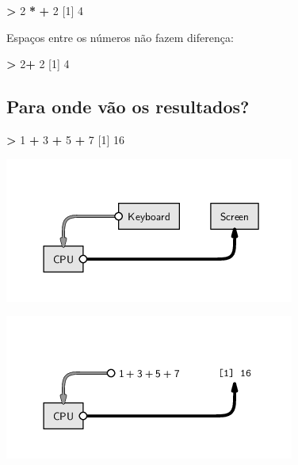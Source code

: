\documentclass[10pt,a4paper]{book}
\newenvironment{Shaded}{\begin{snugshade}}{\end{snugshade}}
\newcommand{\DecValTok}[1]{\textcolor[rgb]{0.00,0.00,0.81}{#1}}
\newcommand{\StringTok}[1]{\textcolor[rgb]{0.31,0.60,0.02}{#1}}
\newcommand{\OperatorTok}[1]{\textcolor[rgb]{0.81,0.36,0.00}{\textbf{#1}}}
\newcommand{\NormalTok}[1]{#1}
\begin{document}
\begin{Shaded}
\begin{Highlighting}[]
\OperatorTok{>}\StringTok{ }\DecValTok{2} \OperatorTok{*}
\OperatorTok{+}\StringTok{ }\DecValTok{2}
\NormalTok{[}\DecValTok{1}\NormalTok{] }\DecValTok{4}
\end{Highlighting}
\end{Shaded}

Espaços entre os números não fazem diferença:

\begin{Shaded}
\begin{Highlighting}[]
\OperatorTok{>}\StringTok{ }\DecValTok{2}\OperatorTok{+}\StringTok{         }\DecValTok{2}
\NormalTok{[}\DecValTok{1}\NormalTok{] }\DecValTok{4}
\end{Highlighting}
\end{Shaded}

\subsection{Para onde vão os
resultados?}\label{para-onde-vuxe3o-os-resultados}

\begin{Shaded}
\begin{Highlighting}[]
\OperatorTok{>}\StringTok{ }\DecValTok{1} \OperatorTok{+}\StringTok{ }\DecValTok{3} \OperatorTok{+}\StringTok{ }\DecValTok{5} \OperatorTok{+}\StringTok{ }\DecValTok{7}
\NormalTok{[}\DecValTok{1}\NormalTok{] }\DecValTok{16}
\end{Highlighting}
\end{Shaded}

\begin{center}\includegraphics[width=0.5\linewidth]{img/script-commandline} \end{center}

\begin{center}\includegraphics[width=0.5\linewidth]{img/script-commandlinedata} \end{center}
\end{document}
